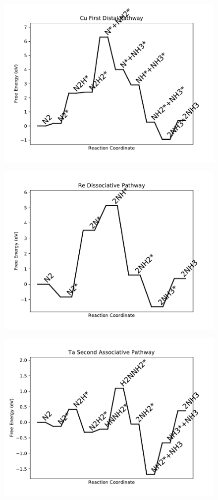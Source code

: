 \begin{figure}
\centering
\includegraphics[width=0.8\linewidth]{data/plots/Cu_distal_1.pdf}
\end{figure}

\begin{figure}
\centering
\includegraphics[width=0.8\linewidth]{data/plots/Re_dissociative.pdf}
\end{figure}

\begin{figure}
\centering
\includegraphics[width=0.8\linewidth]{data/plots/Ta_associative_2.pdf}
\end{figure}

